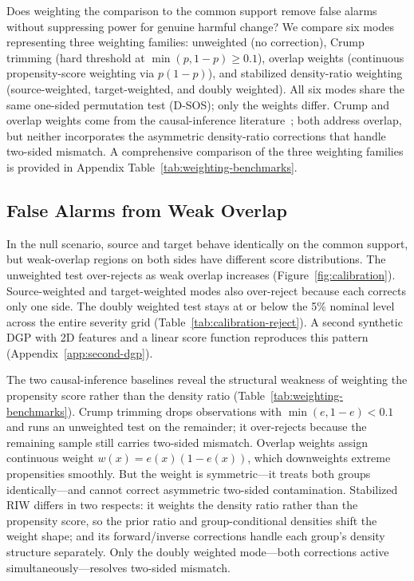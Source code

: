 Does weighting the comparison to the common support remove false alarms without suppressing power for genuine harmful change? We compare six modes representing three weighting families: unweighted (no correction), Crump trimming (hard threshold at $\min(p,1-p) \geq 0.1$), overlap weights (continuous propensity-score weighting via $p(1-p)$), and stabilized density-ratio weighting (source-weighted, target-weighted, and doubly weighted). All six modes share the same one-sided permutation test (D-SOS); only the weights differ. Crump and overlap weights come from the causal-inference literature~\cite{Crump_2009, Li_2018_balancing}; both address overlap, but neither incorporates the asymmetric density-ratio corrections that handle two-sided mismatch. A comprehensive comparison of the three weighting families is provided in Appendix Table~\ref{tab:weighting-benchmarks}.

\subsection{False Alarms from Weak Overlap}\label{sec:calibration}

In the null scenario, source and target behave identically on the common support, but weak-overlap regions on both sides have different score distributions. The unweighted test over-rejects as weak overlap increases (Figure~\ref{fig:calibration}). Source-weighted and target-weighted modes also over-reject because each corrects only one side. The doubly weighted test stays at or below the 5\% nominal level across the entire severity grid (Table~\ref{tab:calibration-reject}). A second synthetic DGP with 2D features and a linear score function reproduces this pattern (Appendix~\ref{app:second-dgp}).

The two causal-inference baselines reveal the structural weakness of weighting the propensity score rather than the density ratio (Table~\ref{tab:weighting-benchmarks}). Crump trimming drops observations with $\min(e,1-e) < 0.1$ and runs an unweighted test on the remainder; it over-rejects because the remaining sample still carries two-sided mismatch. Overlap weights assign continuous weight $w(x) = e(x)(1-e(x))$, which downweights extreme propensities smoothly. But the weight is symmetric---it treats both groups identically---and cannot correct asymmetric two-sided contamination. Stabilized RIW differs in two respects: it weights the density ratio rather than the propensity score, so the prior ratio and group-conditional densities shift the weight shape; and its forward/inverse corrections handle each group's density structure separately. Only the doubly weighted mode---both corrections active simultaneously---resolves two-sided mismatch.

